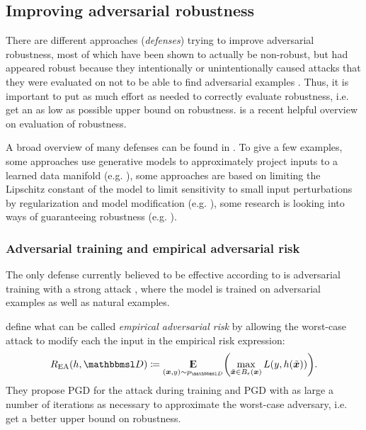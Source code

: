 \documentclass[twocolumn]{article}
\begin{document}
\subsection{Improving adversarial robustness}

There are different approaches (\textit{defenses}) trying to improve adversarial robustness, most of which have been shown to actually be non-robust, but had appeared robust because they intentionally or unintentionally caused attacks that they were evaluated on not to be able to find adversarial examples \citep{Carlini:2017:AEANEDBTM,Athalye:2018:OGGFSS,Uesato:2018:ARDEAWA,Carlini:2017:TERNN}.  Thus, it is important to put as much effort as needed to correctly evaluate robustness, i.e. get an as low as possible upper bound on robustness. \citep{Carlini:2019:OEAR} is a recent helpful overview on evaluation of robustness. 

A broad overview of many defenses can be found in \citet{Serban:2018:AECCP}. To give a few examples, some approaches use generative models to approximately project inputs to a learned data manifold (e.g. \citet{Samangouei:2018:DGPCAAAUGM}), some approaches are based on limiting the Lipschitz constant of the model to limit sensitivity to small input perturbations by regularization and model modification (e.g. \citet{Qian:2018:L2NNN}), some research is looking into ways of guaranteeing robustness (e.g. \citet{Cohen:2019:CARRS}).

\subsubsection{Adversarial training and empirical adversarial risk}

The only defense currently believed to be effective according to \citet{Athalye:2018:OGGFSS} is adversarial training \citep{Goodfellow:2014:EHAE} with a strong attack \citep{Madry:2017:TDLMRAA}, where the model is trained on adversarial examples as well as natural examples.

\cite{Madry:2017:TDLMRAA} define what can be called \textit{empirical adversarial risk} by allowing the worst-case attack to modify each the input in the empirical risk expression:
\begin{align}
R_\text{EA}(h,\set D) \coloneqq \E_{(\vec x, y)\sim p_{\set D}} \del{\max_{\tilde{\vec x}\in B_\epsilon(\vec x)} L(y,h(\tilde{\vec x}))} \text{.}
\end{align}
They propose PGD for the attack during training and PGD with as large a number of iterations as necessary to approximate the worst-case adversary, i.e. get a better upper bound on robustness.
\end{document}
